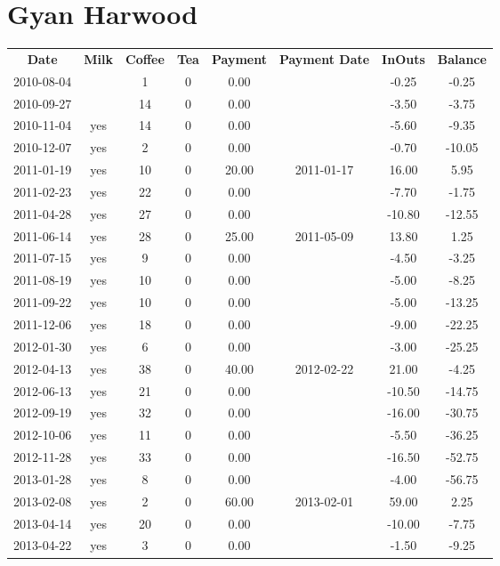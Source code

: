 \section{Gyan Harwood}

\begin{center}
\begin{tabular}{cccccccc}
\textbf{Date} & \textbf{Milk} & \textbf{Coffee} & \textbf{Tea} & \textbf{Payment} & \textbf{Payment Date} & \textbf{InOuts} & \textbf{Balance} \\
2010-08-04 &  &  1 & 0 &  0.00 &  &  -0.25 &  -0.25\\ 
2010-09-27 &  & 14 & 0 &  0.00 &  &  -3.50 &  -3.75\\ 
2010-11-04 & yes & 14 & 0 &  0.00 &  &  -5.60 &  -9.35\\ 
2010-12-07 & yes &  2 & 0 &  0.00 &  &  -0.70 & -10.05\\ 
2011-01-19 & yes & 10 & 0 & 20.00 & 2011-01-17 &  16.00 &   5.95\\ 
2011-02-23 & yes & 22 & 0 &  0.00 &  &  -7.70 &  -1.75\\ 
2011-04-28 & yes & 27 & 0 &  0.00 &  & -10.80 & -12.55\\ 
2011-06-14 & yes & 28 & 0 & 25.00 & 2011-05-09 &  13.80 &   1.25\\ 
2011-07-15 & yes &  9 & 0 &  0.00 &  &  -4.50 &  -3.25\\ 
2011-08-19 & yes & 10 & 0 &  0.00 &  &  -5.00 &  -8.25\\ 
2011-09-22 & yes & 10 & 0 &  0.00 &  &  -5.00 & -13.25\\ 
2011-12-06 & yes & 18 & 0 &  0.00 &  &  -9.00 & -22.25\\ 
2012-01-30 & yes &  6 & 0 &  0.00 &  &  -3.00 & -25.25\\ 
2012-04-13 & yes & 38 & 0 & 40.00 & 2012-02-22 &  21.00 &  -4.25\\ 
2012-06-13 & yes & 21 & 0 &  0.00 &  & -10.50 & -14.75\\ 
2012-09-19 & yes & 32 & 0 &  0.00 &  & -16.00 & -30.75\\ 
2012-10-06 & yes & 11 & 0 &  0.00 &  &  -5.50 & -36.25\\ 
2012-11-28 & yes & 33 & 0 &  0.00 &  & -16.50 & -52.75\\ 
2013-01-28 & yes &  8 & 0 &  0.00 &  &  -4.00 & -56.75\\ 
2013-02-08 & yes &  2 & 0 & 60.00 & 2013-02-01 &  59.00 &   2.25\\ 
2013-04-14 & yes & 20 & 0 &  0.00 &  & -10.00 &  -7.75\\ 
2013-04-22 & yes &  3 & 0 &  0.00 &  &  -1.50 &  -9.25
\end{tabular}
\end{center}

